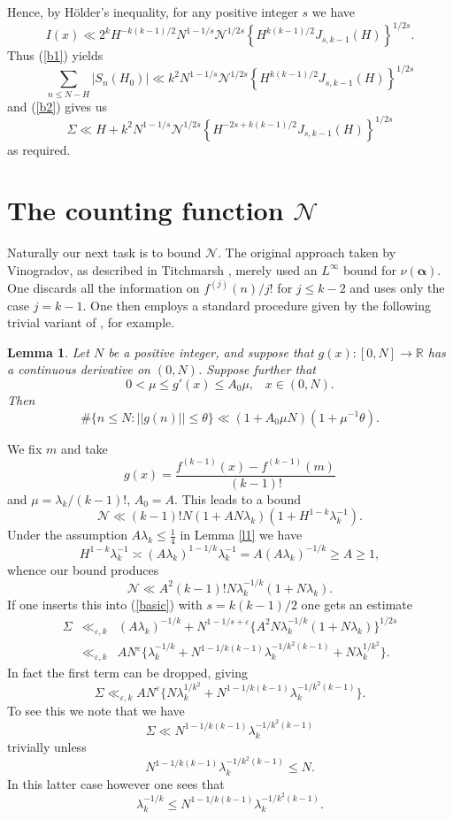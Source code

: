 \documentclass[a4paper,10pt]{article}
\newcommand{\R}{\mathbb{R}}
\newcommand{\ep}{\varepsilon}
\newcommand{\lk}{\lambda_k}
\newcommand{\bal}{\boldsymbol{\alpha}}
\newcommand{\beql}[1]{\begin{equation}\label{#1}}
\newcommand{\eeq}{\end{equation}}
\newtheorem{lemma}{Lemma}
\begin{document}
Hence, by H\"{o}lder's inequality, for any positive integer $s$ we have
\[I(x)\ll
2^kH^{-k(k-1)/2}N^{1-1/s}\mathcal{N}^{1/2s}
\left\{H^{k(k-1)/2}J_{s,k-1}(H)\right\}^{1/2s}.\]
Thus (\ref{b1}) yields
\[\sum_{n\le N-H}|S_n(H_0)|\ll k^2 N^{1-1/s}\mathcal{N}^{1/2s}
\left\{H^{k(k-1)/2}J_{s,k-1}(H)\right\}^{1/2s}\]
and (\ref{b2}) gives us
\[\Sigma\ll H+k^2 N^{1-1/s}\mathcal{N}^{1/2s}
\left\{H^{-2s+k(k-1)/2}J_{s,k-1}(H)\right\}^{1/2s}\]
as required.

\section{The counting function $\mathcal{N}$}\label{secN}

Naturally our next task is to bound $\mathcal{N}$. The original
approach taken by Vinogradov, as described in Titchmarsh \cite[Chapter
6]{Titch}, merely used an $L^{\infty}$ bound for $\nu(\bal)$. One
discards all the information on $f^{(j)}(n)/j!$ for $j\le k-2$ and
uses only the case $j=k-1$. One then employs a standard procedure given by
the following trivial variant of \cite[Lemma 6.11]{Titch}, for
example.
\begin{lemma}\label{space}
Let $N$ be a positive integer, and suppose that $g(x):[0,N]\to\R$ has a
continuous derivative on $(0,N)$.  Suppose further that
\[0<\mu\le g'(x)\le A_0\mu,\;\;\; x\in(0,N).\]
Then
\[\#\{n\le N: ||g(n)||\le \theta\}\ll (1+A_0\mu N)(1+\mu^{-1}\theta).\]
\end{lemma}
We fix $m$ and take
\[g(x)=\frac{f^{(k-1)}(x)-f^{(k-1)}(m)}{(k-1)!}\]
and $\mu=\lk/(k-1)!$, $A_0=A$. This leads to a bound
\[\mathcal{N}\ll (k-1)!N(1+AN\lk)(1+H^{1-k}\lk^{-1}).\]
Under the assumption $A\lk\le \tfrac14$ in Lemma \ref{l1} we have
\[H^{1-k}\lk^{-1}\asymp (A\lk)^{1-1/k}\lk^{-1}=A(A\lk)^{-1/k}\ge A\ge 1,\]
whence our bound produces
\beql{addd}
\mathcal{N}\ll A^2(k-1)!N\lk^{-1/k}(1+N\lk).
\eeq
If one inserts this into (\ref{basic}) with $s=k(k-1)/2$ 
one gets an estimate
\begin{eqnarray*}
\Sigma&\ll_{\ep,k}&
(A\lk)^{-1/k}+N^{1-1/s+\ep}\{A^2N\lk^{-1/k}(1+N\lk)\}^{1/2s}\\
&\ll_{\ep,k}&
AN^{\ep}\{\lk^{-1/k}+N^{1-1/k(k-1)}\lk^{-1/k^2(k-1)}+N\lk^{1/k^2}\}.
\end{eqnarray*}
In fact the first term can be dropped, giving
\beql{vv}
\Sigma\ll_{\ep,k}AN^{\ep}\{N\lk^{1/k^2}+N^{1-1/k(k-1)}\lk^{-1/k^2(k-1)}\}.
\eeq
To see this we note that we have 
\[\Sigma\ll N^{1-1/k(k-1)}\lk^{-1/k^2(k-1)}\]
trivially
unless 
\[N^{1-1/k(k-1)}\lk^{-1/k^2(k-1)}\le N.\]
In this latter case however one sees that
\[\lk^{-1/k}\le N^{1-1/k(k-1)}\lk^{-1/k^2(k-1)}.\]
\end{document}
